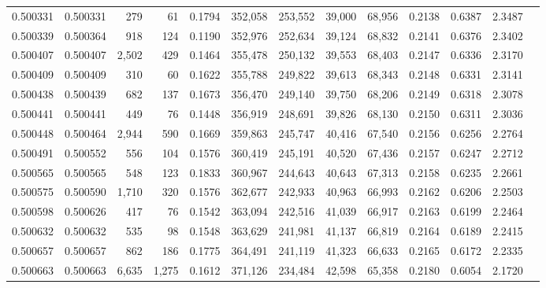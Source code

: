 \begin{tabular}{rrrrrrrrrrrrr}
0.500331 & 0.500331 &   279 &    61 &                                     0.1794 & 352,058 & 253,552 &  39,000 &  68,956 & 0.2138 & 0.6387 & 2.3487 \\
0.500339 & 0.500364 &   918 &   124 &                                     0.1190 & 352,976 & 252,634 &  39,124 &  68,832 & 0.2141 & 0.6376 & 2.3402 \\
0.500407 & 0.500407 & 2,502 &   429 &                                     0.1464 & 355,478 & 250,132 &  39,553 &  68,403 & 0.2147 & 0.6336 & 2.3170 \\
0.500409 & 0.500409 &   310 &    60 &                                     0.1622 & 355,788 & 249,822 &  39,613 &  68,343 & 0.2148 & 0.6331 & 2.3141 \\
0.500438 & 0.500439 &   682 &   137 &                                     0.1673 & 356,470 & 249,140 &  39,750 &  68,206 & 0.2149 & 0.6318 & 2.3078 \\
0.500441 & 0.500441 &   449 &    76 &                                     0.1448 & 356,919 & 248,691 &  39,826 &  68,130 & 0.2150 & 0.6311 & 2.3036 \\
0.500448 & 0.500464 & 2,944 &   590 &                                     0.1669 & 359,863 & 245,747 &  40,416 &  67,540 & 0.2156 & 0.6256 & 2.2764 \\
0.500491 & 0.500552 &   556 &   104 &                                     0.1576 & 360,419 & 245,191 &  40,520 &  67,436 & 0.2157 & 0.6247 & 2.2712 \\
0.500565 & 0.500565 &   548 &   123 &                                     0.1833 & 360,967 & 244,643 &  40,643 &  67,313 & 0.2158 & 0.6235 & 2.2661 \\
0.500575 & 0.500590 & 1,710 &   320 &                                     0.1576 & 362,677 & 242,933 &  40,963 &  66,993 & 0.2162 & 0.6206 & 2.2503 \\
0.500598 & 0.500626 &   417 &    76 &                                     0.1542 & 363,094 & 242,516 &  41,039 &  66,917 & 0.2163 & 0.6199 & 2.2464 \\
0.500632 & 0.500632 &   535 &    98 &                                     0.1548 & 363,629 & 241,981 &  41,137 &  66,819 & 0.2164 & 0.6189 & 2.2415 \\
0.500657 & 0.500657 &   862 &   186 &                                     0.1775 & 364,491 & 241,119 &  41,323 &  66,633 & 0.2165 & 0.6172 & 2.2335 \\
0.500663 & 0.500663 & 6,635 & 1,275 &                                     0.1612 & 371,126 & 234,484 &  42,598 &  65,358 & 0.2180 & 0.6054 & 2.1720 \\

\end{tabular}
